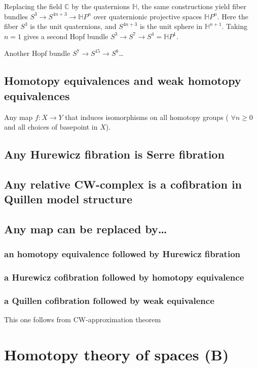 \begin{example}
	Replacing the field $\mathbb{C}$ by the quaternions $\mathbb{H}$, the same constructions yield fiber bundles $S^3\to S^{4n+3}\to\mathbb{H} P^{n}$ over quaternionic projective spaces $\mathbb{H} P^n$. Here the fiber $S^3$ is the unit quaternions, and $S^{4n+3}$ is the unit sphere in $\mathbb{H}^{n+1}$. Taking $n=1$ gives a second Hopf bundle $S^3\to S^7\to S^4=\mathbb{H} P^1$.
	
	Another Hopf bundle $S^7\to S^{15}\to S^8$…
\end{example}

\subsection{Homotopy equivalences and weak homotopy equivalences}

\begin{definition}
	Any map $f:X\to Y$ that induces isomorphisms on all homotopy groups ( $\forall n\geq 0$ and all choices of basepoint in $X$).
\end{definition}

\subsection{Any Hurewicz fibration is Serre fibration}
\subsection{Any relative CW-complex is a cofibration in Quillen model structure}
\subsection{Any map can be replaced by…} 
\subsubsection{an homotopy equivalence followed by Hurewicz fibration}
\subsubsection{a Hurewicz cofibration followed by homotopy equivalence}
\subsubsection{a Quillen cofibration followed by weak equivalence}
This one follows from CW-approximation theorem

\section{Homotopy theory  of spaces (B)}


